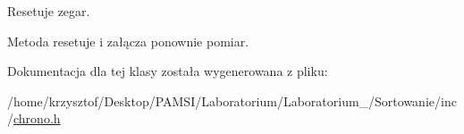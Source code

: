 \-Resetuje zegar. 

\-Metoda resetuje i załącza ponownie pomiar. 

\-Dokumentacja dla tej klasy została wygenerowana z pliku\-:\begin{DoxyCompactItemize}
\item 
/home/krzysztof/\-Desktop/\-P\-A\-M\-S\-I/\-Laboratorium/\-Laboratorium\-\_/\-Sortowanie/inc/\hyperlink{chrono_8h}{chrono.\-h}\end{DoxyCompactItemize}
